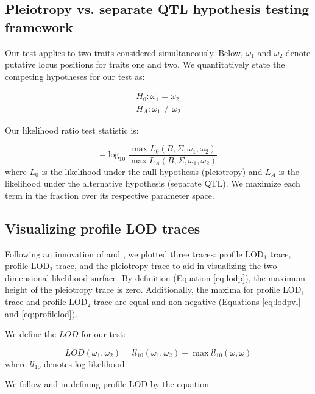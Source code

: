 \documentclass[12pt,twoside, lineno]{gsajnl}
\begin{document}
\subsection{Pleiotropy vs. separate QTL hypothesis testing framework}

Our test applies to two traits considered simultaneously. Below,
$\omega_1$ and $\omega_2$ denote putative locus positions for traits
one and two. We quantitatively state the competing hypotheses for our
test as:

\begin{eqnarray}
H_0: \omega_1 = \omega_2 \nonumber\\
H_A: \omega_1 \neq \omega_2
\label{eqn:hypotheses}
\end{eqnarray}

\noindent Our likelihood ratio test statistic is:

\begin{equation}
- \log_{10} \frac{\max L_0(B, \Sigma, \omega_1, \omega_2)}{\max L_A(B, \Sigma, \omega_1, \omega_2)}
\label{eqn:test-statistic}
\end{equation}
where $L_0$ is the likelihood under the null hypothesis (pleiotropy)
and $L_A$ is the likelihood under the alternative hypothesis (separate
QTL). We maximize each term in the fraction over its respective
parameter space.

\subsection{Visualizing profile LOD traces}

Following an innovation of \citet{zeng2000genetic} and
\citet{tian2016dissection}, we plotted three traces: profile LOD$_1$
trace, profile LOD$_2$ trace, and the pleiotropy trace to aid in
visualizing the two-dimensional likelihood surface. By definition
(Equation \ref{eq:lodp}), the maximum height of the pleiotropy trace
is zero. Additionally, the maxima for profile LOD$_1$ trace and
profile LOD$_2$ trace are equal and non-negative (Equations
\ref{eq:lodpvl} and \ref{eq:profilelod}).

We define the $LOD$ for our test:

\begin{equation}
LOD(\omega_1, \omega_2) = ll_{10}(\omega_1, \omega_2) - \max ll_{10}(\omega, \omega)
\label{eq:lodpvl}
\end{equation}
where $ll_{10}$ denotes log-likelihood.

We follow \citet{zeng2000genetic} and \citet{tian2016dissection} in
defining profile LOD by the equation
\end{document}
